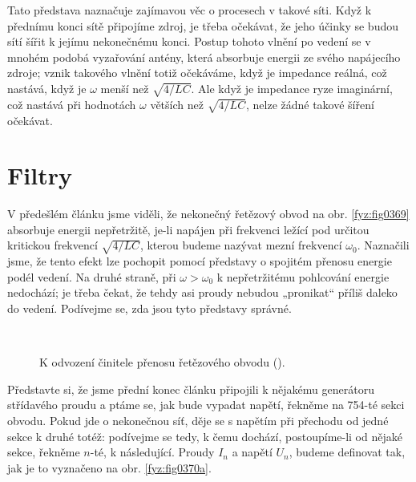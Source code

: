   Tato představa naznačuje zajímavou věc o procesech v takové síti. Když k přednímu konci sítě 
  připojíme zdroj, je třeba očekávat, že jeho účinky se budou sítí šířit k jejímu nekonečnému 
  konci. Postup tohoto vlnění po vedení se v mnohém podobá vyzařování antény, která absorbuje 
  energii ze svého napájecího zdroje; vznik takového vlnění totiž očekáváme, když je impedance 
  reálná, což nastává, když je \(\omega\) menší než \(\sqrt{4/LC}\). Ale když je impedance ryze 
  imaginární, což nastává při hodnotách \(\omega\) větších než \(\sqrt{4/LC}\), nelze žádné takové 
  šíření očekávat.

\section{Filtry}\label{fyz:IIchapXXIIsecVII}
  V předešlém článku jsme viděli, že nekonečný řetězový obvod na obr. \ref{fyz:fig0369} absorbuje 
  energii nepřetržitě, je-li napájen při frekvenci ležící pod určitou kritickou frekvencí 
  \(\sqrt{4/LC}\), kterou budeme nazývat mezní frekvencí \(\omega_0\). Naznačili jsme, že tento 
  efekt lze pochopit pomocí představy o spojitém přenosu energie podél vedení. Na druhé straně, při 
  \(\omega>\omega_0\) k nepřetržitému pohlcování energie nedochází; je třeba čekat, že tehdy asi 
  proudy nebudou „pronikat“ příliš daleko do vedení. Podívejme se, zda jsou tyto představy správné.
  
  \begin{figure}[ht!] %
    \centering
     \\
    \caption{K odvození činitele přenosu řetězového obvodu
             (\cite[s.~410]{Feynman02}).}
    \label{fyz:fig0370}
  \end{figure}
  
  Představte si, že jsme přední konec článku připojili k nějakému generátoru střídavého proudu a 
  ptáme se, jak bude vypadat napětí, řekněme na \num{754}-té sekci obvodu. Pokud jde o nekonečnou 
  síť, děje se s napětím při přechodu od jedné sekce k druhé totéž: podívejme se tedy, k čemu 
  dochází, postoupíme-li od nějaké sekce, řekněme \(n\)-té, k následující. Proudy \(I_n\) a napětí 
  \(U_n\), budeme definovat tak, jak je to vyznačeno na obr. \ref{fyz:fig0370a}.
  
